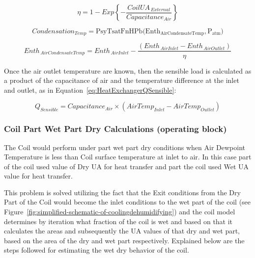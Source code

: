 \begin{equation}
\eta  = 1 - Exp\left\{ { - \frac{{CoilU{A_{\,External}}}}{{Capacitanc{e_{Air}}}}} \right\}
\label{eq:EtaWithCondensation}
\end{equation}

\begin{equation}
Condensatio{n_{Temp}} = {\mathrm{PsyTsatFnHPb(Ent}}{{\mathrm{h}}_{{\mathrm{AirCondensateTemp}}}}{\mathrm{,P_{atm}) }}
\label{eq:CondensationTemp}
\end{equation}

\begin{equation}
Ent{h_{\,AirCondensateTemp}} = Ent{h_{\,AirInlet}} - \frac{{\left( {Ent{h_{\,AirInlet}} - Ent{h_{\,AirOutlet}}} \right)}}{\eta }
\end{equation}

Once the air outlet temperature are known, then the sensible load is calculated as a product of the capacitance of air and the temperature difference at the inlet and outlet, as in Equation~\ref{eq:HeatExchangerQSensible}:

\begin{equation}
{Q_{Sensible}} = Capacitanc{e_{Air}} \times \left( {AirTem{p_{Inlet}} - AirTem{p_{Outlet}}} \right)
\label{eq:HeatExchangerQSensible}
\end{equation}

\subsubsection{Coil Part Wet Part Dry Calculations (operating block)}\label{coil-part-wet-part-dry-calculations-operating-block}

The Coil would perform under part wet part dry conditions when Air Dewpoint Temperature is less than Coil surface temperature at inlet to air. In this case part of the coil used value of Dry UA for heat transfer and part the coil used Wet UA value for heat transfer.

This problem is solved utilizing the fact that the Exit conditions from the Dry Part of the Coil would become the inlet conditions to the wet part of the coil (see Figure~\ref{fig:simplified-schematic-of-coolingdehumidifying}) and the coil model determines by iteration what fraction of the coil is wet and based on that it calculates the areas and subsequently the UA values of that dry and wet part, based on the area of the dry and wet part respectively. Explained below are the steps followed for estimating the wet dry behavior of the coil.

